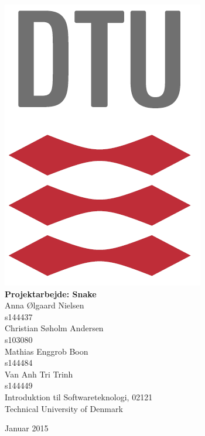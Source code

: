 \begin{center}

\vspace*{-30mm} \noindent
\hfill \includegraphics[height=15 mm]{pics/DTULogo.png} \\[50mm]

{\Huge \bf Projektarbejde: Snake %
}\\[40mm]

{\Large Anna Ølgaard Nielsen} \\  s144437 \\[10mm]
{\Large Christian Søholm Andersen} \\  s103080 \\[10mm]
{\Large Mathias Enggrob Boon} \\  s144484 \\[10mm]
{\Large Van Anh Tri Trinh } \\  s144449 \\[40mm]


Introduktion til Softwareteknologi,  02121\\              
Technical University of Denmark\\[4mm]                    
\centerline{\large Januar 2015}                         

\end{center}
\thispagestyle{empty}
\newpage
